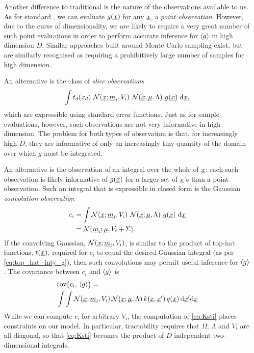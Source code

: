 \documentclass[twoside]{article}
\begin{document}
Another difference to traditional  is the nature of the observations available to us. As for standard , we can evaluate $g(\underline{\smash{x}})$ for any $\underline{\smash{x}}$, a \emph{point observation}. However, due to the curse of dimensionality, we are likely to require a very great number of such point evaluations in order to perform accurate inference for $\langle g \rangle$ in high dimension $D$. Similar approaches built around Monte Carlo sampling \citep{genz1992numerical} exist, but are similarly recognised as requiring a prohibitively large number of samples for high dimension. 


An alternative is the class of \emph{slice observations}
\begin{equation}
 \int t_d(x_d)~\mathcal{N}(\underline{\smash{x}};\underline{\smash{m}}_i,V_i)~\mathcal{N}(\underline{\smash{x}};\underline{\smash{\mu}},\Lambda)~g(\underline{\smash{x}})~\mathrm{d} \underline{\smash{x}},
\end{equation}
which are expressible using standard error functions. Just as for sample evaluations, however, such observations are not very informative in high dimension. The problem for both types of observation is that, for increasingly high $D$, they are informative of only an increasingly tiny quantity of the domain over which $g$ must be integrated. 

An alternative is the observation of an integral over the whole of $\underline{\smash{x}}$: each such observation is likely informative of $g(\underline{\smash{x}})$ for a larger set of $\underline{\smash{x}}$'s than a point observation.
Such an integral that is expressible in closed form is the Gaussian \emph{convolution observation}
 \begin{align}\label{eq:conv}
 c_i & = \int \mathcal{N}(\underline{\smash{x}};\underline{\smash{m}}_i,V_i)~\mathcal{N}(\underline{\smash{x}};\underline{\smash{\mu}},\Lambda)~g(\underline{\smash{x}})~\mathrm{d} \underline{\smash{x}} \nonumber\\
& = \mathcal{N}(\underline{\smash{m}}_i;\underline{\smash{\mu}},V_i+\Sigma).
\end{align}
 If the convolving Gaussian, $\mathcal{N}(\underline{\smash{x}};\underline{\smash{m}}_i,V_i)$, is similar to the product of top-hat functions, $t(\underline{\smash{x}})$, required for $c_i$ to equal the desired Gaussian integral (as per \eqref{eq:top_hat_inty_g}), then such convolutions may permit useful inference for $\langle g \rangle$. The covariance between $c_i$ and $\langle g \rangle$ is
\begin{align}\label{eq:Ksti}
& \text{cov}\bigl(c_i,\,\langle g \rangle\bigr) =\nonumber\\
& \int \int  \mathcal{N}(\underline{\smash{x}};\underline{\smash{m}}_i,V_i)\,\mathcal{N}(\underline{\smash{x}};\underline{\smash{\mu}},\Lambda)\,k(\underline{\smash{x}}, \underline{\smash{x}}')\,q(\underline{\smash{x}})\,\mathrm{d} \underline{\smash{x}}' \mathrm{d} \underline{\smash{x}} 
\end{align}
While we can compute $c_i$ for arbitrary $V_i$, the computation of \eqref{eq:Ksti} places constraints on our model. In particular, tractability requires that $\Omega$, $\Lambda$ and $V_i$ are all diagonal, so that \eqref{eq:Ksti} becomes the product of $D$ independent two-dimensional integrals.
\end{document}
